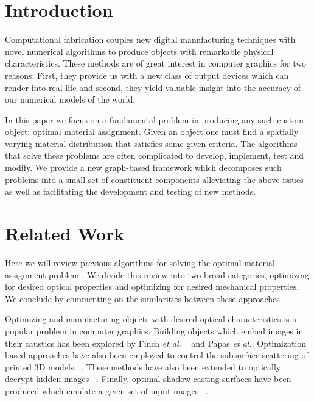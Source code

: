 \documentclass[annual]{acmsiggraph}
\newcommand{\note}[1]{\marginpar{\LARGE $\spadesuit$}
			$\spadesuit$ {\bf #1} $\spadesuit$}
\begin{document}
\keywordlist

\TOGlinkslist

\copyrightspace



\section{Introduction}
Computational fabrication couples new digital manufacturing techniques with novel numerical algorithms to produce objects with remarkable physical characteristics. These methods are of great interest in computer graphics for two reasons: First, they provide us with  a new class of output devices which can render into  real-life and second, they yield valuable insight into the accuracy of our numerical models of the world.  

In this paper we focus on a fundamental problem in producing any such custom object:  optimal material assignment. Given an object one must find a spatially varying material distribution that satisfies some given criteria. The algorithms that solve these problems are often complicated to develop, implement, test and modify. We provide a new graph-based framework which decomposes such problems into a small set of constituent components alleviating the above issues as well as facilitating the development and testing of new methods. 

\section{Related Work} 
Here we will review previous algorithms for solving the optimal material assignment problem . We divide this review into two broad categories, optimizing for desired optical properties and optimizing for desired mechanical properties. We conclude by commenting on the similarities between these approaches.

Optimizing and manufacturing objects with desired optical characteristics is a popular problem in computer graphics. Building objects which embed images in their caustics has been explored by Finch \textit{et al.} ~ and Papas \textit{et al.}. Optimization based approaches have also been employed to control the subsurface scattering of printed 3D models ~\cite{Hasan:2010}. These methods have also been extended to optically decrypt hidden images ~\cite{Papas:2012}. Finally, optimal shadow casting surfaces have been produced which emulate a given set of input images ~\cite{Bermano:2012}.
\end{document}
